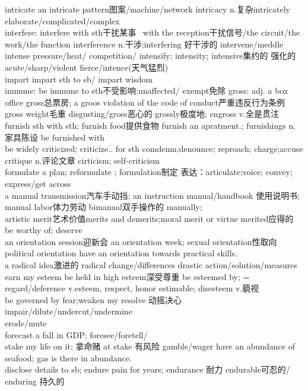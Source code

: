 \documentclass[a4paper,12pt]{article}
\begin{document}
intricate
an intricate pattern图案/machine/network
intricacy n.复杂intricately
elaborate/complicated/complex
\\interfere:
interfere with sth干扰某事 ~with the reception干扰信号/the circuit/the work/the function
interference n.干涉;interfering 好干涉的
intervene/meddle
\\intense pressure/heat/ competition/
intensify; intensity; intensive集约的 强化的
acute/sharp/violent
fierce/intence(天气猛烈)
\\impart
impart sth to sb/ impart wisdom
\\immune: be immune to sth不受影响;unaffected/ exempt免除
gross: adj. a box office gross总票房; a groos violation of the code of conduct严重违反行为条例 gross weight毛重
disgusting/gross恶心的
grossly极度地; engross v.全是贯注
\\furnish sth with sth; furnish food提供食物 furnish an apratment.; furnishings n.家具陈设
be furnished with 
\\be widely criticized; criticize.. for sth
comdemn;denounce; reproach; charge;accuse
critique n.评论文章 cirticism; self-criticism
\\formulate a plan; reformulate ; formulation制定
表达：articulate;voice; convey; express/get across
\\a manual transmission汽车手动挡; an instruction manual/handbook 使用说明书; manual labor体力劳动
bimanual双手操作的 manually;
\\artistic merit艺术价值merits and demerits;moral merit or virtue
merited应得的 be worthy of; deserve
\\an orientation session迎新会 an orientation week; sexual orientation性取向political orientation
have an orientation towards practical skills.
\\a radical idea激进的 radical change/differences 
drastic action/solution/measures
\\earn my esteem
be held in high esteem深受尊重 be esteemed by;  = regard/deference 
v.esteem, respect, honor
estimable; disesteem v.藐视
\\be governed by fear;weaken my resolve 动摇决心impair/dilute/undercut/undermine
\\erode/mute
\\forecast a fall in GDP; foresee/foretell/
\\stake my life on it; 拿命赌  at stake 有风险
gamble/wager
have an abundance of seafood; gas is there in abundance.
\\disclose details to sb;
endure pain for years;  endurance 耐力 endurable可忍的/ enduring 持久的
\end{document}
